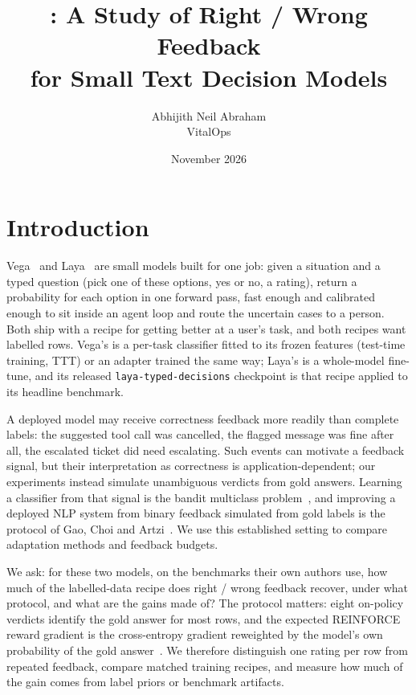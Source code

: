 \documentclass[11pt]{article}
\title{\pk{}: A Study of Right / Wrong Feedback\\for Small Text Decision Models}
\author{Abhijith Neil Abraham\\VitalOps}
\date{November 2026}
\begin{document}
\maketitle

\begin{abstract}

\end{abstract}

\section{Introduction}

Vega~\citep{vegaml} and Laya~\citep{laya} are small models built for one job: given a situation and a typed question (pick one of these options, yes or no, a rating), return a probability for each option in one forward pass, fast enough and calibrated enough to sit inside an agent loop and route the uncertain cases to a person. Both ship with a recipe for getting better at a user's task, and both recipes want labelled rows. Vega's is a per-task classifier fitted to its frozen features (test-time training, TTT) or an adapter trained the same way; Laya's is a whole-model fine-tune, and its released \texttt{laya-typed-decisions} checkpoint is that recipe applied to its headline benchmark.

A deployed model may receive correctness feedback more readily than complete labels: the suggested tool call was cancelled, the flagged message was fine after all, the escalated ticket did need escalating. Such events can motivate a feedback signal, but their interpretation as correctness is application-dependent; our experiments instead simulate unambiguous verdicts from gold answers. Learning a classifier from that signal is the bandit multiclass problem~\citep{kakade2008banditron,crammer2011multiclass,daniely2013price}, and improving a deployed NLP system from binary feedback simulated from gold labels is the protocol of Gao, Choi and Artzi~\citep{gao2022simulating}. We use this established setting to compare adaptation methods and feedback budgets.

We ask: for these two models, on the benchmarks their own authors use, how much of the labelled-data recipe does right / wrong feedback recover, under what protocol, and what are the gains made of? The protocol matters: eight on-policy verdicts identify the gold answer for most rows, and the expected REINFORCE reward gradient is the cross-entropy gradient reweighted by the model's own probability of the gold answer~\citep{zhang2018generalized,davis2025reinforce}. We therefore distinguish one rating per row from repeated feedback, compare matched training recipes, and measure how much of the gain comes from label priors or benchmark artifacts.
\end{document}
